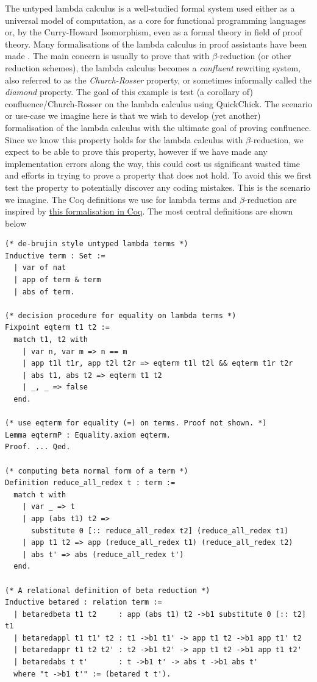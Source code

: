 \documentclass[twoside,11pt,openright]{report}
\newenvironment{code}{\captionsetup{type=figure, singlelinecheck=off, justification=raggedleft}}{}
\begin{document}
The untyped lambda calculus is a well-studied formal system used either as a universal model of computation, as a core for functional programming languages or, by the Curry-Howard Isomorphism, even as a formal theory in field of proof theory. Many formalisations of the lambda calculus in proof assistants have been made \cite{koprowskiformalization}\cite{swords2006soundness}\cite{segundoformalizing}\cite{aydemir2007nominal}. The main concern is usually to prove that with $\beta$-reduction (or other reduction schemes), the lambda calculus becomes a \textit{confluent} rewriting system, also referred to as the \textit{Church-Rosser} property, or sometimes informally called the \textit{diamond} property. The goal of this example is test (a corollary of) confluence/Church-Rosser on the lambda calculus using QuickChick. The scenario or use-case we imagine here is that we wish to develop (yet another) formalisation of the lambda calculus with the ultimate goal of proving confluence. Since we know this property holds for the lambda calculus with $\beta$-reduction, we expect to be able to prove this property, however if we have made any implementation errors along the way, this could cost us significant wasted time and efforts in trying to prove a property that does not hold. To avoid this we first test the property to potentially discover any coding mistakes. This is the scenario we imagine. The Coq definitions we use for lambda terms and $\beta$-reduction are inspired by \href{https://github.com/pi8027/lambda-calculus}{this formalisation in Coq}. The most central definitions are shown below
\begin{code}
\begin{verbatim}
(* de-brujin style untyped lambda terms *)
Inductive term : Set := 
  | var of nat 
  | app of term & term 
  | abs of term.

(* decision procedure for equality on lambda terms *)
Fixpoint eqterm t1 t2 :=
  match t1, t2 with
    | var n, var m => n == m
    | app t1l t1r, app t2l t2r => eqterm t1l t2l && eqterm t1r t2r
    | abs t1, abs t2 => eqterm t1 t2
    | _, _ => false
  end.

(* use eqterm for equality (=) on terms. Proof not shown. *)
Lemma eqtermP : Equality.axiom eqterm.
Proof. ... Qed.

(* computing beta normal form of a term *)
Definition reduce_all_redex t : term :=
  match t with
    | var _ => t
    | app (abs t1) t2 =>
      substitute 0 [:: reduce_all_redex t2] (reduce_all_redex t1)
    | app t1 t2 => app (reduce_all_redex t1) (reduce_all_redex t2)
    | abs t' => abs (reduce_all_redex t')
  end.

(* A relational definition of beta reduction *)
Inductive betared : relation term :=
  | betaredbeta t1 t2     : app (abs t1) t2 ->b1 substitute 0 [:: t2] t1
  | betaredappl t1 t1' t2 : t1 ->b1 t1' -> app t1 t2 ->b1 app t1' t2
  | betaredappr t1 t2 t2' : t2 ->b1 t2' -> app t1 t2 ->b1 app t1 t2'
  | betaredabs t t'       : t ->b1 t' -> abs t ->b1 abs t'
  where "t ->b1 t'" := (betared t t').

\end{verbatim}
\end{code}
\end{document}
